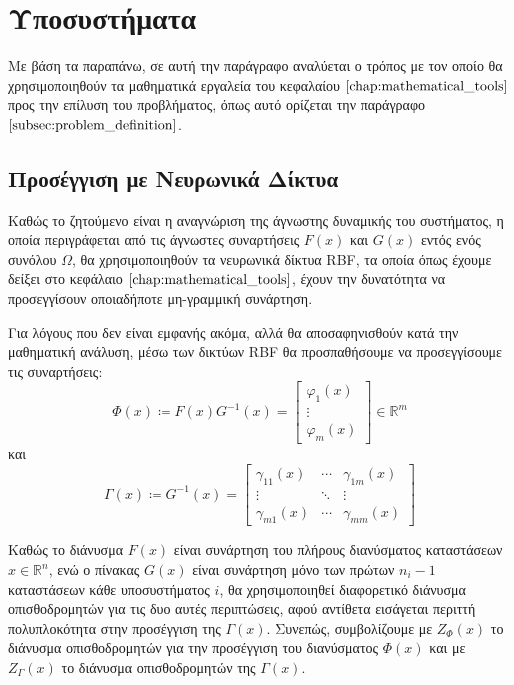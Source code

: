 \section{Υποσυστήματα}
Με βάση τα παραπάνω, σε αυτή την παράγραφο αναλύεται ο τρόπος με τον οποίο θα χρησιμοποιηθούν τα μαθηματικά εργαλεία του κεφαλαίου $\ref{chap:mathematical_tools}$ προς την επίλυση του προβλήματος, όπως αυτό ορίζεται την παράγραφο $\ref{subsec:problem_definition}$.

\subsection{Προσέγγιση με Νευρωνικά Δίκτυα}
Καθώς το ζητούμενο είναι η αναγνώριση της άγνωστης δυναμικής του συστήματος, η οποία περιγράφεται από τις άγνωστες συναρτήσεις $F(x)$ και $G(x)$ εντός ενός συνόλου $\Omega$, θα χρησιμοποιηθούν τα νευρωνικά δίκτυα RBF, τα οποία όπως έχουμε δείξει στο κεφάλαιο $\ref{chap:mathematical_tools}$, έχουν την δυνατότητα να προσεγγίσουν οποιαδήποτε μη-γραμμική συνάρτηση.

Για λόγους που δεν είναι εμφανής ακόμα, αλλά θα αποσαφηνισθούν κατά την μαθηματική ανάλυση, μέσω των δικτύων RBF θα προσπαθήσουμε να προσεγγίσουμε τις συναρτήσεις:
\begin{equation}
	\Phi(x) \coloneqq F(x)G^{-1}(x) = 
	\begin{bmatrix}
	\varphi_1(x) \\ \vdots \\ \varphi_m(x)
	\end{bmatrix} \in \mathbb{R}^m
	\label{eq:approximate_F}
\end{equation}
και
\begin{equation}
\Gamma(x) \coloneqq G^{-1}(x) = 
\begin{bmatrix} \gamma_{11}(x) & \cdots & \gamma_{1m}(x) \\
					 \vdots    & \ddots & \vdots         \\
				\gamma_{m1}(x) & \cdots & \gamma_{mm}(x)
\end{bmatrix}
\label{eq:approximate_G}
\end{equation}


Καθώς το διάνυσμα $F(x)$ είναι συνάρτηση του πλήρους διανύσματος καταστάσεων $x \in \mathbb{R}^n$, ενώ ο πίνακας $G(x)$ είναι συνάρτηση μόνο των πρώτων $n_i - 1$ καταστάσεων κάθε υποσυστήματος $i$, θα χρησιμοποιηθεί διαφορετικό διάνυσμα οπισθοδρομητών για τις δυο αυτές περιπτώσεις, αφού αντίθετα εισάγεται περιττή πολυπλοκότητα στην προσέγγιση της $\Gamma(x)$. Συνεπώς, συμβολίζουμε με $Z_{\varPhi}(x)$ το διάνυσμα οπισθοδρομητών για την προσέγγιση του διανύσματος $\varPhi(x)$ και με $Z_{\Gamma}(x)$ το διάνυσμα οπισθοδρομητών της $\Gamma(x)$.


